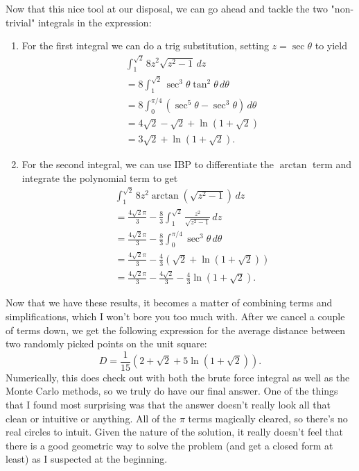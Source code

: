 Now that this nice tool at our disposal, we can go ahead and tackle the two "non-trivial" integrals in the expression:
\begin{enumerate}
    \item For the first integral we can do a trig substitution, setting \( z = \sec{\theta} \) to yield
    \begin{align*}
        &\int_{1}^{\sqrt{2}} 8z^2 \sqrt{z^2 - 1} \, dz \\
        &= 8 \int_{1}^{\sqrt{2}} \sec^3{\theta} \tan^2{\theta} \, d\theta \\
        &= 8 \int_{0}^{\pi / 4} \left( \sec^5{\theta} - \sec^3{\theta} \right) \, d\theta \\
        &= 4 \sqrt{2} - \sqrt{2} + \ln{\left( 1 + \sqrt{2} \right)} \\
        &= 3 \sqrt{2} + \ln{\left( 1 + \sqrt{2} \right)}
    .\end{align*}

    \item For the second integral, we can use IBP to differentiate the \( \arctan \) term and integrate the polynomial term to get
    \begin{align*}
        &\int_{1}^{\sqrt{2}} 8z^2 \arctan{\left( \sqrt{z^2 - 1} \right)} \, dz \\
        &= \frac{4 \sqrt{2} \pi}{3} - \frac{8}{3} \int_{1}^{\sqrt{2}} \frac{z^2}{\sqrt{z^2 - 1}} \, dz \\
        &= \frac{4 \sqrt{2} \pi}{3} - \frac{8}{3} \int_{0}^{\pi / 4} \sec^3{\theta} \, d\theta \\
        &= \frac{4 \sqrt{2} \pi}{3} - \frac{4}{3} \left( \sqrt{2} + \ln{\left( 1 + \sqrt{2} \right)} \right) \\
        &= \frac{4 \sqrt{2} \pi}{3} - \frac{4 \sqrt{2}}{3} - \frac{4}{3} \ln{\left( 1 + \sqrt{2} \right)}
    .\end{align*}
\end{enumerate}
Now that we have these results, it becomes a matter of combining terms and
simplifications, which I won't bore you too much with. After we cancel a couple
of terms down,  we get the
following expression for the average distance between two randomly picked
points on the unit square:
\[
    D = \boxed{\frac{1}{15} \left( 2 + \sqrt{2} + 5 \ln{\left( 1 + \sqrt{2} \right)} \right)}
.\]
Numerically, this does check out with both the brute force integral as well as
the Monte Carlo methods, so we truly do have our final answer. One of the
things that I found most surprising was that the answer doesn't really look all
that clean or intuitive or anything. All of the \( \pi \) terms magically
cleared, so there's no real circles to intuit. Given the nature of the
solution, it really doesn't feel that there is a good geometric way to solve
the problem (and get a closed form at least) as I suspected at the beginning.

